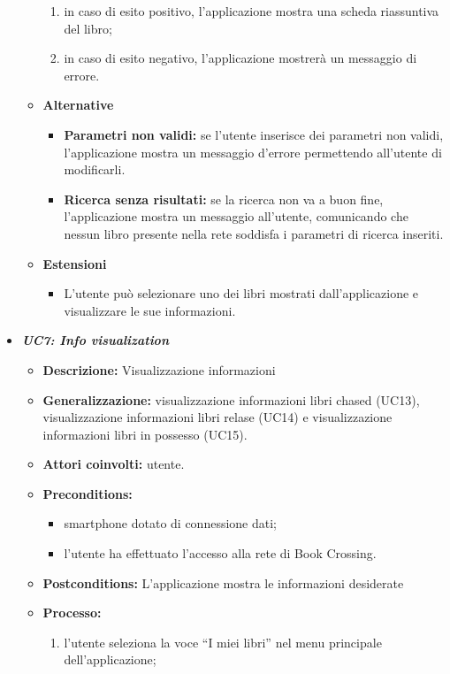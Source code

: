 \begin{itemize}
\begin{itemize}
\begin{enumerate}
			\item in caso di esito positivo, l’applicazione mostra una scheda riassuntiva del libro;
			\item in caso di esito negativo, l’applicazione mostrerà un messaggio di errore.
		\end{enumerate}
		\item \textbf{Alternative}
		\begin{itemize}
			\item \textbf{Parametri non validi:} se l'utente inserisce dei parametri non validi, l'applicazione mostra un messaggio d'errore permettendo all'utente di modificarli.
			\item \textbf{Ricerca senza risultati:} se la ricerca non va a buon fine, l'applicazione mostra un messaggio all'utente, comunicando che nessun libro presente nella rete soddisfa i parametri di ricerca inseriti.
		\end{itemize}
		\item \textbf{Estensioni}
		\begin{itemize}
			\item L'utente può selezionare uno dei libri mostrati dall'applicazione e visualizzare le sue informazioni.
		\end{itemize}
	\end{itemize}
	\item \textbf{\textit{UC7: Info visualization}}
	\begin{itemize}
		\item \textbf{Descrizione: } Visualizzazione informazioni
		\item \textbf{Generalizzazione:} visualizzazione informazioni libri chased (UC13), visualizzazione informazioni libri relase (UC14) e visualizzazione informazioni libri in possesso (UC15).
		\item \textbf{Attori coinvolti:} utente.
		\item \textbf{Preconditions:}
		\begin{itemize}
			\item smartphone dotato di connessione dati;
			\item l’utente ha effettuato l’accesso alla rete di Book Crossing.
		\end{itemize}
		\item \textbf{Postconditions:} L’applicazione mostra le informazioni desiderate
		\item \textbf{Processo:}
		\begin{enumerate}
			\item l’utente seleziona la voce “I miei libri” nel menu principale dell’applicazione;

\end{enumerate}
\end{itemize}
\end{itemize}
